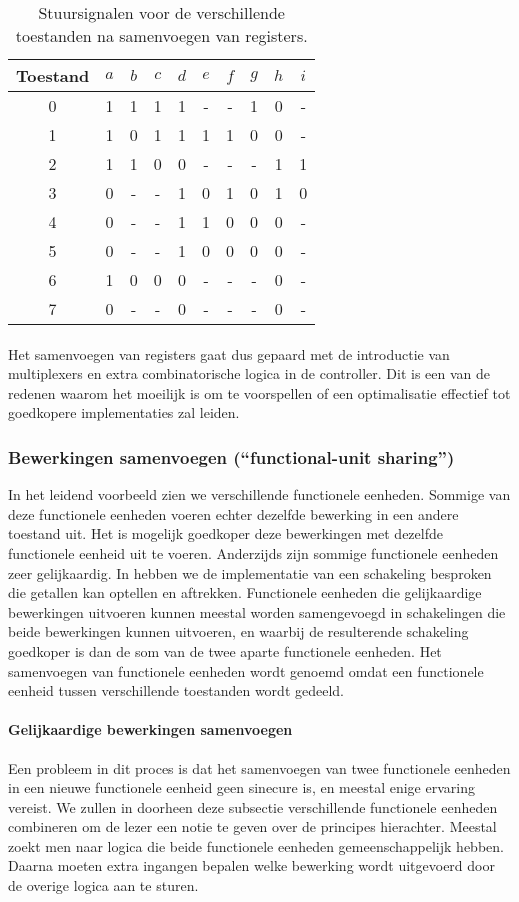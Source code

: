 \begin{table}[hbt]
\centering
\begin{tabular}{c|ccc|cccc|cc}
Toestand&$a$&$b$&$c$&$d$&$e$&$f$&$g$&$h$&$i$\\\hline
0&1&1&1&1&-&-&1&0&-\\
1&1&0&1&1&1&1&0&0&-\\
2&1&1&0&0&-&-&-&1&1\\
3&0&-&-&1&0&1&0&1&0\\
4&0&-&-&1&1&0&0&0&-\\
5&0&-&-&1&0&0&0&0&-\\
6&1&0&0&0&-&-&-&0&-\\
7&0&-&-&0&-&-&-&0&-
\end{tabular}
\caption{Stuursignalen voor de verschillende toestanden na samenvoegen van registers.}
\end{table}
\paragraph{}
Het samenvoegen van registers gaat dus gepaard met de introductie van multiplexers en extra combinatorische logica in de controller. Dit is een van de redenen waarom het moeilijk is om te voorspellen of een optimalisatie effectief tot goedkopere implementaties zal leiden.
\subsubsection{Bewerkingen samenvoegen (``functional-unit sharing'')}
In het leidend voorbeeld zien we verschillende functionele eenheden. Sommige van deze functionele eenheden voeren echter dezelfde bewerking in een andere toestand uit. Het is mogelijk goedkoper deze bewerkingen met dezelfde functionele eenheid uit te voeren. Anderzijds zijn sommige functionele eenheden zeer gelijkaardig. In  hebben we de implementatie van een schakeling besproken die getallen kan optellen en aftrekken. Functionele eenheden die gelijkaardige bewerkingen uitvoeren kunnen meestal worden samengevoegd in schakelingen die beide bewerkingen kunnen uitvoeren, en waarbij de resulterende schakeling goedkoper is dan de som van de twee aparte functionele eenheden. Het samenvoegen van functionele eenheden wordt  genoemd omdat een functionele eenheid tussen verschillende toestanden wordt gedeeld.
\paragraph{Gelijkaardige bewerkingen samenvoegen}
Een probleem in dit proces is dat het samenvoegen van twee functionele eenheden in een nieuwe functionele eenheid geen sinecure is, en meestal enige ervaring vereist. We zullen in doorheen deze subsectie verschillende functionele eenheden combineren om de lezer een notie te geven over de principes hierachter. Meestal zoekt men naar logica die beide functionele eenheden gemeenschappelijk hebben. Daarna moeten extra ingangen bepalen welke bewerking wordt uitgevoerd door de overige logica aan te sturen.
